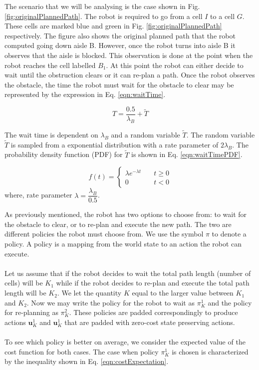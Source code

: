 \documentclass[a4paper,12pt]{article}
\begin{document}
			The scenario that we will be analysing is the case shown in Fig. \ref{fig:originalPlannedPath}. The robot is required to go from a cell $I$ to a cell $G$. These cells are marked blue and green in Fig. \ref{fig:originalPlannedPath} respectively. The figure also shows the original planned path that the robot computed going down aisle B. However, once the robot turns into aisle B it observes that the aisle is blocked. This observation is done at the point when the robot reaches the cell labelled $B_{1}$. At this point the robot can either decide to wait until the obstruction clears or it can re-plan a path. Once the robot observes the obstacle, the time the robot must wait for the obstacle to clear may be represented by the expression in Eq. \ref{eqn:waitTime}. 

			\begin{equation}
				T=\frac{0.5}{\lambda_{B}}+\widetilde{T}
				\label{eqn:waitTime}
			\end{equation}

			The wait time is dependent on $\lambda_{B}$ and a random variable $\widetilde{T}$. The random variable $\widetilde{T}$ is sampled from a exponential distribution with a rate parameter of $2\lambda_{B}$. The probability density function (PDF) for $\widetilde{T}$ is shown in Eq. \ref{eqn:waitTimePDF}. 

			\begin{equation}
				f(t) = 
				\begin{cases}
				\lambda e^{-\lambda t} & \quad t \geq 0 \\
				0 & \quad t < 0
				\end{cases}
				\label{eqn:waitTimePDF}
			\end{equation}
			where, rate parameter $\lambda = \dfrac{\lambda_{B}}{0.5}$. 
			
			As previously mentioned, the robot has two options to choose from: to wait for the obstacle to clear, or to re-plan and execute the new path. The two are different policies the robot must choose from. We use the symbol $\pi$ to denote a policy. A policy is a mapping from the world state to an action the robot can execute.
			\\
			\\
			Let us assume that if the robot decides to wait the total path length (number of cells) will be $K_1$ while if the robot decides to re-plan and execute the total path length will be $K_2$. We let the quantity $K$ equal to the larger value between $K_1$ and $K_2$. Now we may write the policy for the robot to wait as $\pi_{K}^{1}$ and the policy for re-planning as $\pi_{K}^{2}$. These policies are padded correspondingly to produce actions $\textbf{u}_{K}^{1}$ and $\textbf{u}_{K}^{1}$ that are padded with zero-cost state preserving actions.
			\\
			\\
			To see which policy is better on average, we consider the expected value of the cost function for both cases. The case when policy $\pi_{K}^{1}$ is chosen is characterized by the inequality shown in Eq. \ref{eqn:costExpectation}.
\end{document}

